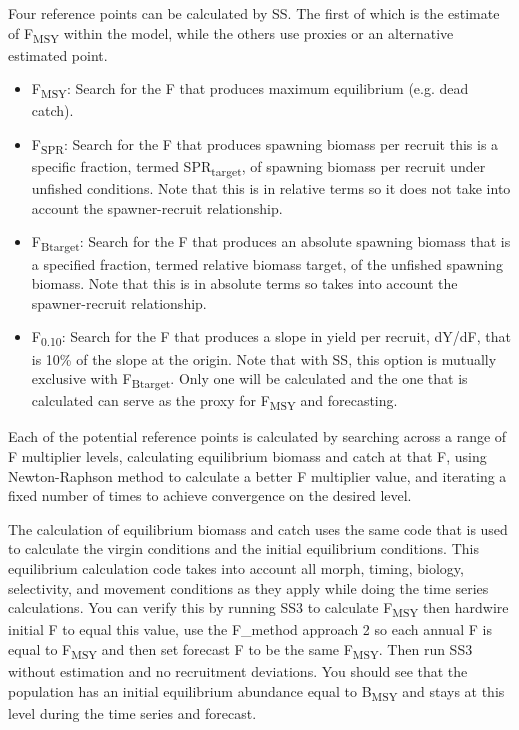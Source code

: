 Four reference points can be calculated by SS.  The first of which is the estimate of F\textsubscript{MSY} within the model, while the others use proxies or an alternative estimated point.

\begin{itemize}
	\item F\textsubscript{MSY}: Search for the F that produces maximum equilibrium (e.g. dead catch).
	
	\item F\textsubscript{SPR}: Search for the F that produces spawning biomass per recruit this is a specific fraction, termed SPR\textsubscript{target}, of spawning biomass per recruit under unfished conditions. Note that this is in relative terms so it does not take into account the spawner-recruit relationship.
	
	\item F\textsubscript{Btarget}: Search for the F that produces an absolute spawning biomass that is a specified fraction, termed relative biomass target, of the unfished spawning biomass. Note that this is in absolute terms so takes into account the spawner-recruit relationship. 
	
	\item F\textsubscript{0.10}: Search for the F that produces a slope in yield per recruit, dY/dF, that is 10\% of the slope at the origin. Note that with SS, this option is mutually exclusive with F\textsubscript{Btarget}. Only one will be calculated and the one that is calculated can serve as the proxy for F\textsubscript{MSY} and forecasting.
\end{itemize}

Each of the potential reference points is calculated by searching across a range of F multiplier levels, calculating equilibrium biomass and catch at that F, using Newton-Raphson method to calculate a better F multiplier value, and iterating a fixed number of times to achieve convergence on the desired level.

The calculation of equilibrium biomass and catch uses the same code that is used to calculate the virgin conditions and the initial equilibrium conditions.  This equilibrium calculation code takes into account all morph, timing, biology, selectivity, and movement conditions as they apply while doing the time series calculations.  You can verify this by running SS3 to calculate F\textsubscript{MSY} then hardwire initial F to equal this value, use the F\_method approach 2 so each annual F is equal to F\textsubscript{MSY} and then set forecast F to be the same F\textsubscript{MSY}.  Then run SS3 without estimation and no recruitment deviations.  You should see that the population has an initial equilibrium abundance equal to B\textsubscript{MSY} and stays at this level during the time series and forecast.

